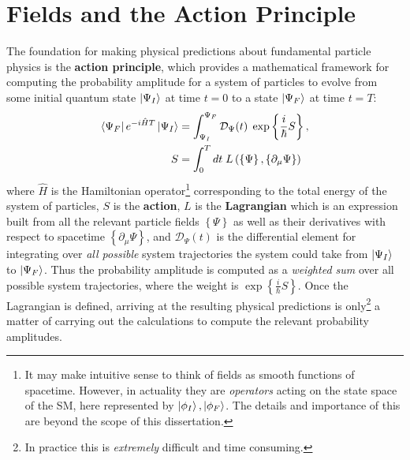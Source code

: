 \section{Fields and the Action Principle}
The foundation for making physical predictions about fundamental particle physics is the \textbf{action principle}, which provides a mathematical framework \cite{Feynman:1942us} for computing the probability amplitude for a system of particles to evolve from some initial quantum state $\ket{\Psi_I}$ at time $t=0$ to a state $\ket{\Psi_F}$ at time $t=T$:
\begin{align}
    \bra{\Psi_F} e^{-i\hat{H}T} \ket{\Psi_I} &= \int_{\Psi_I}^{\Psi_F} \mathcal{D}_{\Psi}(t)\; \exp \left\{ \frac{i}{\hbar} S \right\}, \label{eq:path_integral} \\
    S &= \int_0^T dt\; L \left( \left\{ \Psi \right\}, \left\{ \partial_\mu \Psi \right\} \right) \nonumber
\end{align}
where $\hat{H}$ is the Hamiltonian operator\footnote{It may make intuitive sense to think of fields as smooth functions of spacetime. However, in actuality they are \textit{operators} acting on the state space of the SM, here represented by $\ket{\phi_I}, \ket{\phi_F}$. The details and importance of this are beyond the scope of this dissertation.} corresponding to the total energy of the system of particles, $S$ is the \textbf{action}, $L$ is the \textbf{Lagrangian} which is an expression built from all the relevant particle fields $\left\{ \Psi \right\}$ as well as their derivatives with respect to spacetime $\left\{ \partial_\mu \Psi \right\}$, and $\mathcal{D}_{\Psi}(t)$ is the differential element for integrating over \textit{all possible} system trajectories the system could take from $\ket{\Psi_I}$ to $\ket{\Psi_F}$.
Thus the probability amplitude is computed as a \textit{weighted sum} over all possible system trajectories, where the weight is $\exp \left\{ \frac{i}{\hbar} S \right\}$.
Once the Lagrangian is defined, arriving at the resulting physical predictions is only\footnote{In practice this is \textit{extremely} difficult and time consuming.} a matter of carrying out the calculations to compute the relevant probability amplitudes.

